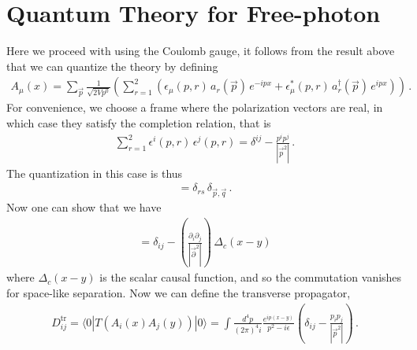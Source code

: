 \documentclass[11pt, onesided]{book}
\theoremstyle{break}
\theoremstyle{break}
\newcommand{\pd}{\partial}
\begin{document}
\section[Quantum Theory for Free-photon]{\color{red}Quantum Theory for Free-photon\color{black}}
Here we proceed with using the Coulomb gauge, it follows from the result above that we can quantize the theory by defining
\begin{align*}
A_\mu(x) = \sum_{\vec{p}} \frac{1}{\sqrt{2V p^0}}\left( \sum_{r=1}^2\left(
\epsilon_\mu(p,r)\, a_r(\vec{p})\, e^{-ipx} + \epsilon_\mu^*(p,r) \, a_r^\dagger(\vec{p})\, e^{ipx}\right)\right)\,.
\end{align*}
For convenience, we choose a frame where the polarization vectors are real, 
in which case they satisfy the completion relation, that is
\begin{align*}
\sum_{r=1}^2 \epsilon^i(p,r) \, \epsilon^j(p,r) = \delta^{ij} - \frac{p^i p^j}{|\vec{p}^2|}\,.
\end{align*}
The quantization in this case is thus
\begin{align*}
[a_r(\vec{p}) ,\, a_s^\dagger(\vec{q})] = \delta_{rs}\, \delta_{\vec{p}, \vec{q}}\,.
\end{align*}
Now one can show that we have
\begin{align*}
[A_i(x),\, A_j(y)] = \delta_{ij} - \left(\frac{\pd_i \pd_j}{|\vec{\pd}^2|}\right)\, \Delta_c(x-y)
\end{align*}
where $\Delta_c(x-y)$ is the scalar causal function, and so the commutation vanishes for space-like separation. Now we can define the transverse propagator, 
\begin{align*}
D_{ij}^{\text{tr}} = \langle 0 | T(A_i(x) A_j(y))|0\rangle = \int \frac{d^4p}{(2\pi)^4 i} \frac{e^{ip(x-y)}}{p^2 - i\epsilon}\left( \delta_{ij} - \frac{p_i p_j}{|\vec{p}^2|}\right)\,.
\end{align*}
\end{document}

